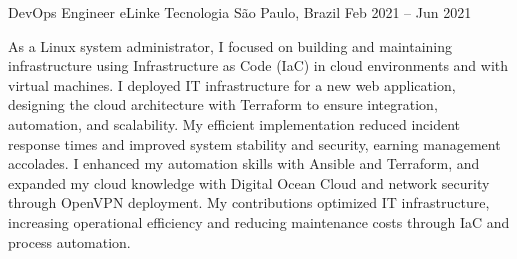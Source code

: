 \experience
  {DevOps Engineer}
  {eLinke Tecnologia}
  {São Paulo, Brazil}
  {Feb 2021 -- Jun 2021}
  {
    \item As a Linux system administrator, I focused on building and maintaining infrastructure using Infrastructure as Code (IaC) in cloud environments and with virtual machines. I deployed IT infrastructure for a new web application, designing the cloud architecture with Terraform to ensure integration, automation, and scalability. My efficient implementation reduced incident response times and improved system stability and security, earning management accolades. I enhanced my automation skills with Ansible and Terraform, and expanded my cloud knowledge with Digital Ocean Cloud and network security through OpenVPN deployment. My contributions optimized IT infrastructure, increasing operational efficiency and reducing maintenance costs through IaC and process automation.
  }